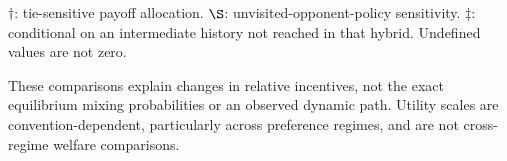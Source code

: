 \documentclass[10pt]{article}
\begin{document}
{$\dagger$: tie-sensitive payoff allocation. $\S$: unvisited-opponent-policy sensitivity. $\ddagger$: conditional on an intermediate history not reached in that hybrid. Undefined values are not zero.\par
These comparisons explain changes in relative incentives, not the exact equilibrium mixing probabilities or an observed dynamic path. Utility scales are convention-dependent, particularly across preference regimes, and are not cross-regime welfare comparisons.}\par
\end{document}
